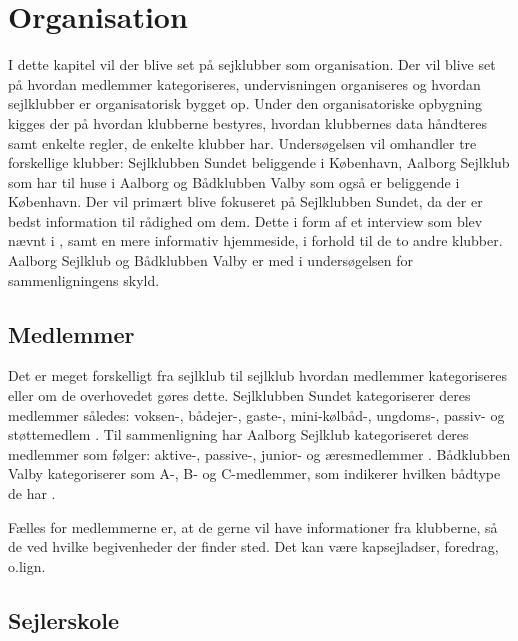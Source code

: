 \chapter{Organisation}\label{chap:organisation}

I dette kapitel vil der blive set på sejklubber som organisation. Der vil blive set på hvordan medlemmer kategoriseres,
undervisningen organiseres og hvordan sejlklubber er organisatorisk bygget op. Under den organisatoriske opbygning
kigges der på hvordan klubberne bestyres, hvordan klubbernes data håndteres samt enkelte regler, de enkelte klubber har.
Undersøgelsen vil omhandler tre forskellige klubber: Sejlklubben Sundet beliggende i København, Aalborg Sejlklub som har
til huse i Aalborg og Bådklubben Valby som også er beliggende i København. Der vil primært blive fokuseret på
Sejlklubben Sundet, da der er bedst information til rådighed om dem. Dette i form af et interview som blev nævnt i
, samt en mere informativ hjemmeside, i forhold til de to andre klubber.
Aalborg Sejlklub og Bådklubben Valby er med i undersøgelsen for sammenligningens skyld.


\section{Medlemmer}\label{sec:organisation-medlemmer}

Det er meget forskelligt fra sejlklub til sejlklub hvordan medlemmer kategoriseres eller om de overhovedet gøres dette.
Sejlklubben Sundet kategoriserer deres medlemmer således: voksen-, bådejer-, gaste-, mini-kølbåd-, ungdoms-, passiv- og
støttemedlem \citep{sundet_vedtaegter}. \newline
Til sammenligning har Aalborg Sejlklub kategoriseret deres medlemmer som følger: aktive-, passive-, junior- og
æresmedlemmer \citep{aalborg_sejlklub_vedtaegter}. \newline
Bådklubben Valby kategoriserer som A-, B- og C-medlemmer, som indikerer hvilken bådtype de har
\citep{badklubben_valby_love}.

Fælles for medlemmerne er, at de gerne vil have informationer fra klubberne, så de ved hvilke begivenheder der finder
sted. Det kan være kapsejladser, foredrag, o.lign.


\section{Sejlerskole}\label{sec:sejlerskole}

